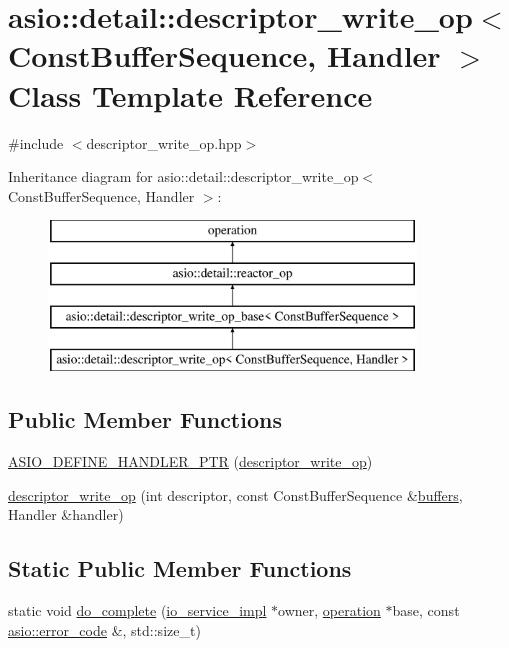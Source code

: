\hypertarget{classasio_1_1detail_1_1descriptor__write__op}{}\section{asio\+:\+:detail\+:\+:descriptor\+\_\+write\+\_\+op$<$ Const\+Buffer\+Sequence, Handler $>$ Class Template Reference}
\label{classasio_1_1detail_1_1descriptor__write__op}


{\ttfamily \#include $<$descriptor\+\_\+write\+\_\+op.\+hpp$>$}

Inheritance diagram for asio\+:\+:detail\+:\+:descriptor\+\_\+write\+\_\+op$<$ Const\+Buffer\+Sequence, Handler $>$\+:\begin{figure}[H]
\begin{center}
\leavevmode
\includegraphics[height=4.000000cm]{classasio_1_1detail_1_1descriptor__write__op}
\end{center}
\end{figure}
\subsection*{Public Member Functions}
\begin{DoxyCompactItemize}
\item 
\hyperlink{classasio_1_1detail_1_1descriptor__write__op_a71be8a5f4433a363ae686fedbf791026}{A\+S\+I\+O\+\_\+\+D\+E\+F\+I\+N\+E\+\_\+\+H\+A\+N\+D\+L\+E\+R\+\_\+\+P\+T\+R} (\hyperlink{classasio_1_1detail_1_1descriptor__write__op}{descriptor\+\_\+write\+\_\+op})
\item 
\hyperlink{classasio_1_1detail_1_1descriptor__write__op_a724881561745343c0d8e02a766c37be0}{descriptor\+\_\+write\+\_\+op} (int descriptor, const Const\+Buffer\+Sequence \&\hyperlink{group__async__read_ga54dede45c3175148a77fe6635222c47d}{buffers}, Handler \&handler)
\end{DoxyCompactItemize}
\subsection*{Static Public Member Functions}
\begin{DoxyCompactItemize}
\item 
static void \hyperlink{classasio_1_1detail_1_1descriptor__write__op_acfaa13c4493817c6ed5ecb2eb35a3eaa}{do\+\_\+complete} (\hyperlink{namespaceasio_1_1detail_a6d61d9b8e53c11288be549d82aec5a42}{io\+\_\+service\+\_\+impl} $\ast$owner, \hyperlink{namespaceasio_1_1detail_a338968609bec20e37145309f8f9ec936}{operation} $\ast$base, const \hyperlink{classasio_1_1error__code}{asio\+::error\+\_\+code} \&, std\+::size\+\_\+t)
\end{DoxyCompactItemize}
